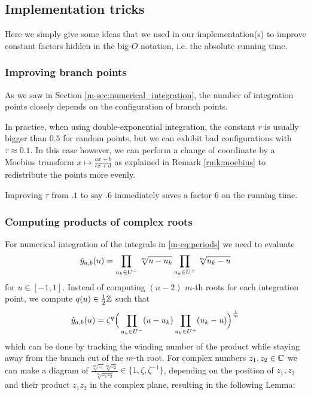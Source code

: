 \documentclass[main.tex]{subfiles}
\begin{document}
   \subsection{Implementation tricks}

   Here we simply give some ideas that we used in our implementation(s) to improve constant factors hidden in the big-$O$ notation, i.e. the absolute running time.

   \subsubsection{Improving branch points}

   As we saw in Section \ref{m-sec:numerical_integration}, the number of integration points
   closely depends on the configuration of branch points.

   In practice, when using double-exponential integration, the constant $r$ is usually bigger than $0.5$
   for random points, but we can exhibit bad configurations with $τ\approx 0.1$.
   In this case however, we can perform a change of coordinate by a Moebius transform
   $x\mapsto \frac{ax+b}{cx+d}$ as explained in Remark \ref{rmk:moebius} to redistribute the points more evenly.

   Improving $τ$ from $.1$ to say $.6$ immediately saves a factor $6$ on the running time.

  \subsubsection{Computing products of complex roots}\label{subsec:computing_roots}

  For numerical integration of the integrals in \eqref{m-eq:periods}
  we need to evaluate
  \begin{equation*}
   \tilde{y}_{a,b}(u) = \prod_{u_k\in U^-} \sqrt[m]{u-u_k}\prod_{u_k\in U^+}\sqrt[m]{u_k-u}
  \end{equation*}
  for $u \in [-1,1]$. Instead of computing $(n-2)$ $m$-th roots for each
  integration point, we compute $q(u)\in\frac12\mathbb{Z}$ such that
  \begin{equation*}
   \tilde{y}_{a,b}(u) = \zeta^q \Big( \prod_{u_k\in U^-}(u-u_k) \prod_{u_k\in U^+} (u_k-u) \Big)^{\frac{1}{m}}
  \end{equation*}
 which can be done by tracking
  the winding number of the product while staying away from the branch cut
  of the $m$-th root.
  For complex numbers $z_1,z_2 \in \mathbb{C}$ we can make a diagram of
  $\frac{\sqrt[m]{z_1}\sqrt[m]{z_2}}{\sqrt[m]{z_1z_2}} \in \{ 1, \zeta,
  \zeta^{-1} \}$, depending on the position of $z_1,z_2$ and their product
  $z_1z_2$ in the complex plane, resulting in the following Lemma:
\end{document}
